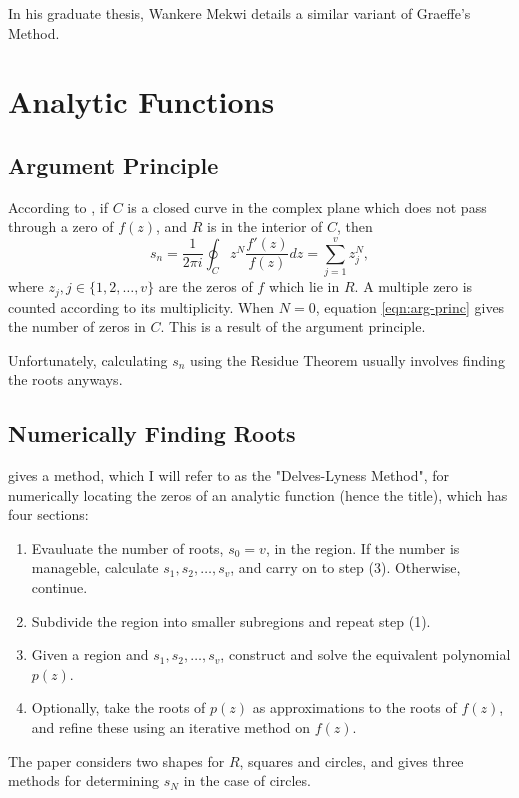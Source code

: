 \documentclass{article}
\begin{document}
\smallskip

In his graduate thesis\cite{iterative}, Wankere Mekwi details a similar variant of Graeffe's Method.

\section{Analytic Functions}

\subsection{Argument Principle}

According to \cite{delves1967numerical},
if $C$ is a closed curve in the complex plane which does not pass through a zero of $f(z)$, and $R$ is in the interior of $C$, 
then
\begin{equation}\label{eqn:arg-princ}
	s_n=\frac{1}{2\pi i}\oint_Cz^N\frac{f'(z)}{f(z)}dz=\sum_{j=1}^vz_j^N,
\end{equation}
where $z_j,j\in\{1,2,\dots,v\}$ are the zeros of $f$ which lie in $R$.
A multiple zero is counted according to its multiplicity.
When $N=0$, equation \ref{eqn:arg-princ} gives the number of zeros in $C$.
This is a result of the argument principle.\cite{wiki:argument-principle}

Unfortunately, calculating $s_n$ using the Residue Theorem usually involves finding the roots anyways.

\subsection{Numerically Finding Roots}

\cite{delves1967numerical} gives a method, which I will refer to as the "Delves-Lyness Method", for numerically locating the zeros of an analytic function (hence the title),
which has four sections:
\begin{enumerate}
	\item Evauluate the number of roots, $s_0=v$, in the region.
	If the number is manageble, calculate $s_1,s_2,\dots,s_v$, and carry on to step (3).
	Otherwise, continue.
	\item
	Subdivide the region into smaller subregions and repeat step (1).
	\item Given a region and $s_1,s_2,\dots,s_v$, construct and solve the equivalent polynomial $p(z)$.
	\item Optionally, take the roots of $p(z)$ as approximations to the roots of $f(z)$,
	and refine these using an iterative method on $f(z)$.
\end{enumerate}
The paper considers two shapes for $R$, squares and circles, 
and  gives three methods for determining $s_N$ in the case of circles.

\printbibliography
\end{document}
